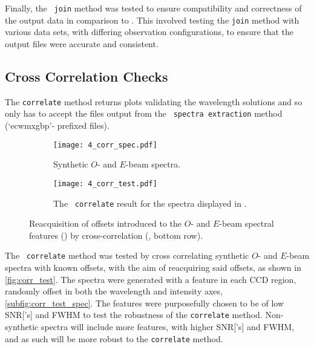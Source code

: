Finally, the \stops\ \texttt{join} method was tested to ensure compatibility and correctness of the output data in comparison to \polsalt.
This involved testing the \texttt{join} method with various data sets, with differing observation configurations, to ensure that the output files were accurate and consistent.

\subsection{Cross Correlation Checks} \label{subsec:test_corr}

The \texttt{correlate} method returns plots validating the wavelength solutions and so only has to accept the files output from the \polsalt\ \texttt{spectra extraction}  method (`ecwmxgbp'- prefixed files).

\begin{figure}
    \centering
    \begin{subfigure}[b]{\textwidth}
        \centering
        \texttt{[image: 4\_corr\_spec.pdf]}
        \caption{Synthetic $O$- and $E$-beam spectra.}
        \label{subfig:corr_test_spec}
    \end{subfigure}
    \hfill
    \begin{subfigure}[b]{\textwidth}
        \centering
        \texttt{[image: 4\_corr\_test.pdf]}
        \caption{The \stops\ \texttt{correlate} result for the spectra displayed in .}
        \label{subfig:corr_test_corr}
    \end{subfigure}
    \caption{Reacquisition of offsets introduced to the $O$- and $E$-beam spectral features () by cross-correlation (, bottom row).}
    \label{fig:corr_test}
\end{figure}

The \stops\ \texttt{correlate} method was tested by cross correlating synthetic $O$- and $E$-beam spectra with known offsets, with the aim of reacquiring said offsets, as shown in \autoref{fig:corr_test}.
The spectra were generated with a feature in each \gls{CCD} region, randomly offset in both the wavelength and intensity axes, \autoref{subfig:corr_test_spec}. The features were purposefully chosen to be of low \gls{SNR}['s] and \gls{FWHM} to test the robustness of the \texttt{correlate} method. Non-synthetic spectra will include more features, with higher \gls{SNR}['s] and \gls{FWHM}, and as such will be more robust to the \texttt{correlate} method.

